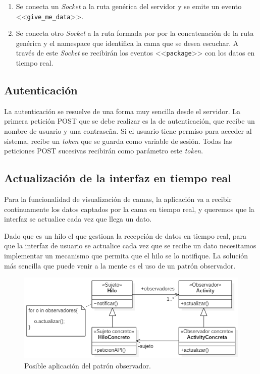 \begin{enumerate}
	\item Se conecta un \textit{Socket} a la ruta genérica del servidor y se emite un evento <<\texttt{give\_me\_data}>>. 
	\item Se conecta otro \textit{Socket} a la ruta formada por por la concatenación de la ruta genérica y el namespace que identifica la cama que se desea escuchar. A través de este \textit{Socket} se recibirán los eventos <<\texttt{package}>> con los datos en tiempo real. 
\end{enumerate}

\subsection{Autenticación}

La autenticación se resuelve de una forma muy sencilla desde el servidor. La primera petición POST que se debe realizar es la de autenticación, que recibe un nombre de usuario y una contraseña. Si el usuario tiene permiso para acceder al sistema, recibe un \textit{token} que se guarda como variable de sesión. Todas las peticiones POST sucesivas recibirán como parámetro este \textit{token}. 

\subsection{Actualización de la interfaz en tiempo real}

Para la funcionalidad de visualización de camas, la aplicación va a recibir continuamente los datos captados por la cama en tiempo real, y queremos que la interfaz se actualice cada vez que llega un dato. 

Dado que es un hilo el que gestiona la recepción de datos en tiempo real, para que la interfaz de usuario se actualice cada vez que se recibe un dato necesitamos implementar un mecanismo que permita que el hilo se lo notifique. La solución más sencilla que puede venir a la mente es el uso de un patrón observador. 

\begin{figure}[H]
	\centering
	\includegraphics[width=1\textwidth]{../img/observador.png}
	\caption{Posible aplicación del patrón observador.}
	\label{fig:observador}
\end{figure}

